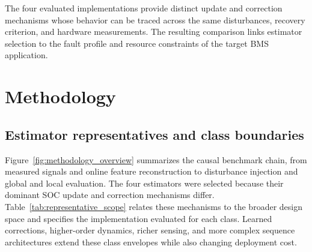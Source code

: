 \documentclass[review,nopreprintline]{elsarticle}
\begin{document}
The four evaluated implementations provide distinct update and correction mechanisms whose behavior can be traced across the same disturbances, recovery criterion, and hardware measurements. The resulting comparison links estimator selection to the fault profile and resource constraints of the target BMS application.

\section{Methodology}
\subsection{Estimator representatives and class boundaries}
Figure~\ref{fig:methodology_overview} summarizes the causal benchmark chain, from measured signals and online feature reconstruction to disturbance injection and global and local evaluation. The four estimators were selected because their dominant SOC update and correction mechanisms differ. Table~\ref{tab:representative_scope} relates these mechanisms to the broader design space and specifies the implementation evaluated for each class. Learned corrections, higher-order dynamics, richer sensing, and more complex sequence architectures extend these class envelopes while also changing deployment cost.
\end{document}
